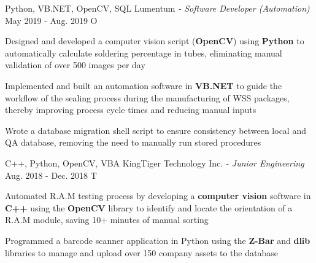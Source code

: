 \begin{siderules}
\begin{cventries}
{\begin{cvitems}
      \end{cvitems}
    }
    \cventry
      {Python, VB.NET, OpenCV, SQL}
      {Lumentum\hspace{0.15em} \bodyfontlight\itshape{- Software Developer (Automation)}}
      {May 2019 - Aug. 2019}
      {O}
      {
        \begin{cvitems}
          \item {Designed and developed a computer vision script (\textbf{OpenCV}) using \textbf{Python} to automatically calculate soldering percentage in tubes, eliminating manual validation of over 500 images per day}
          \item {Implemented and built an automation software in \textbf{VB.NET} to guide the workflow of the sealing process during the manufacturing of WSS packages, thereby improving process cycle times and reducing manual inputs}
          \item {Wrote a database migration shell script to ensure consistency between local and QA database, removing the need to manually run stored procedures}
        \end{cvitems}
      }
    \cventry
      {C++, Python, OpenCV, VBA}
      {KingTiger Technology Inc.\hspace{0.15em} \bodyfontlight\itshape{- Junior Engineering}}
      {Aug. 2018 - Dec. 2018}
      {T}
      {
        \begin{cvitems}
          \item {Automated R.A.M testing process by developing a \textbf{computer vision} software in \textbf{C++} using the \textbf{OpenCV} library to identify and locate the orientation of a R.A.M module, saving 10+ minutes of manual sorting}
          \item {Programmed a barcode scanner application in Python using the \textbf{Z-Bar} and \textbf{dlib} libraries to manage and upload over 150 company assets to the database}
        \end{cvitems}
      }
  \end{cventries}
\end{siderules}